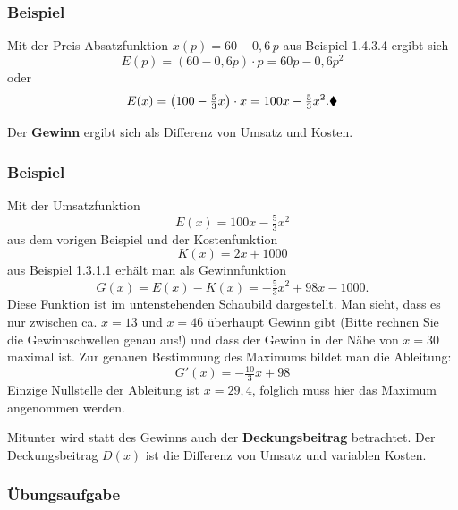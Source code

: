 \subsubsection{Beispiel}

Mit der Preis-Absatzfunktion $x(p) = 60 - 0{,}6\,p$ aus Beispiel 1.4.3.4 ergibt sich
\[ E(p) = (60 - 0{,}6p) \cdot p = 60p - 0{,}6p^2 \]
oder
\[ E(x) = \left(100 - \tfrac{5}{3} x\right) \cdot x = 100x - \tfrac{5}{3} x^2 .\beispielende \]

Der \textbf{Gewinn} ergibt sich als Differenz von Umsatz und Kosten.

\subsubsection{Beispiel}

Mit der Umsatzfunktion
\[ E(x) = 100x - \tfrac{5}{3} x^2 \]
aus dem vorigen Beispiel und der Kostenfunktion
\[ K(x) = 2x + 1000 \]
aus Beispiel 1.3.1.1 erhält man als Gewinnfunktion
\[ G(x) = E(x) - K(x) = -\tfrac{5}{3} x^2 + 98x - 1000 . \]
Diese Funktion ist im untenstehenden Schaubild dargestellt. Man sieht, dass es nur zwischen ca. $x = 13$ und $x = 46$ überhaupt Gewinn gibt (Bitte rechnen Sie die Gewinnschwellen genau aus!) und dass der Gewinn in der Nähe von $x = 30$ maximal ist. Zur genauen Bestimmung des Maximums bildet man die Ableitung:
\[ G'(x) = -\tfrac{10}{3} x + 98 \]
Einzige Nullstelle der Ableitung ist $x = 29{,}4$, folglich muss hier das Maximum angenommen werden.

\begin{center}
\end{center}

Mitunter wird statt des Gewinns auch der \textbf{Deckungsbeitrag} betrachtet. Der Deckungsbeitrag $D(x)$ ist die Differenz von Umsatz und variablen Kosten.

\subsubsection{Übungsaufgabe}

